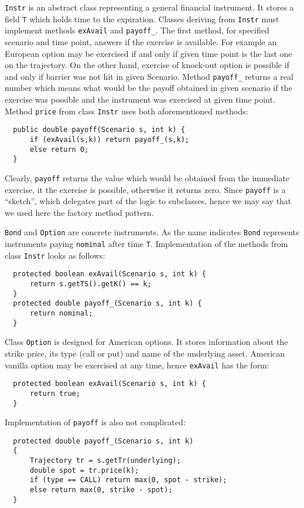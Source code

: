\documentclass[a4paper,11pt, twoside]{book}
\theoremstyle{definition}
\theoremstyle{remark}
\begin{document}
\texttt{Instr} is an abstract class representing a general financial instrument. It stores a field \texttt{T} which holds time to the expiration. Classes deriving from \texttt{Instr} must implement methods \texttt{exAvail} and \texttt{payoff\_}. The first method, for specified scenario and time point, answers if the exercise is available. For example an European option may be exercised if and only if given time point is the last one on the trajectory. On the other hand, exercise of knock-out option is possible if and only if barrier was not hit in given Scenario. Method \texttt{payoff\_} returns a real number which means what would be the payoff obtained in given scenario if the exercise was possible and the instrument was exercised at given time point. Method \texttt{price} from class \texttt{Instr} uses both aforementioned methods:
\begin{lstlisting}
  public double payoff(Scenario s, int k) {
      if (exAvail(s,k)) return payoff_(s,k);
      else return 0;
  }
\end{lstlisting}
Clearly, \texttt{payoff} returns the value which would be obtained from the immediate exercise, it the exercise is possible, otherwise it returns zero. Since \texttt{payoff} is a ``sketch'', which delegates part of the logic to subclasses, hence we may say that we used here the factory method pattern. 

\texttt{Bond} and \texttt{Option} are concrete instruments. As the name indicates \texttt{Bond} represents instruments paying \texttt{nominal} after time \texttt{T}. Implementation of the methods from class \texttt{Instr} looks as follows: 
\begin{lstlisting}
  protected boolean exAvail(Scenario s, int k) {        
      return s.getTS().getK() == k;
  }
  protected double payoff_(Scenario s, int k) {
      return nominal;
  }
\end{lstlisting}

	
Class \texttt{Option} is designed for American options. It stores information about the strike price, its type (call or put) and name of the underlying asset. American vanilla option may be exercised at any time, hence \texttt{exAvail} has the form:
\begin{lstlisting}
  protected boolean exAvail(Scenario s, int k) {
      return true;
  }
\end{lstlisting}
Implementation of \texttt{payoff} is also not complicated:
\begin{lstlisting}
  protected double payoff_(Scenario s, int k)
  {
      Trajectory tr = s.getTr(underlying);
      double spot = tr.price(k);
      if (type == CALL) return max(0, spot - strike);
      else return max(0, strike - spot);
  }
\end{lstlisting}
\end{document}
